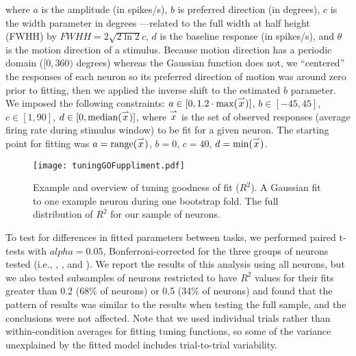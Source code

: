 \noindent where $a$ is the amplitude (in spikes/s), $b$ is preferred direction (in degrees), $c$ is the width parameter in degrees ---related to the full width at half height (FWHH) by $FWHH = 2 \sqrt{2 \ln 2}c$, $d$ is the baseline response (in spikes/s), and $\theta$ is the motion direction of a stimulus.  
Because motion direction has a periodic domain ($[0, 360)$ degrees) whereas the Gaussian function does not, we ``centered'' the responses of each neuron so its preferred direction of motion was around zero prior to fitting, then we applied the inverse shift to the estimated $b$ parameter.
We imposed the following constraints: $a \in [0, 1.2 \cdot \max (\overset{\rightharpoonup} x)]$, $b \in [-45, 45]$, $c \in [1, 90]$, $d \in [0, \textrm{median}(\overset{\rightharpoonup} x)]$, where $\overset{\rightharpoonup} x$ is the set of observed responses (average firing rate during stimulus window) to be fit for a given neuron.
The starting point for fitting was $a = \textrm{range}(\overset{\rightharpoonup} x)$, $b = 0$, $c = 40$, $d = \textrm{min}(\overset{\rightharpoonup} x)$.



	\setcounter{scratchcounter}{\value{figure}}
	\setcounter{figure}{\thesupplementcounter}
	\renewcommand{\figurename}{Supplemental Figure}
	\begin{figure}
		\centering
		\texttt{[image: tuningGOFuppliment.pdf]}
		\caption{Example and overview of tuning goodness of fit ($R^2$). A Gaussian fit to one example neuron during one bootstrap fold. The full distribution of $R^2$ for our sample of neurons.}
		\label{fig:suppFit} %
	\end{figure}
	\setcounter{supplementcounter}{\value{figure}}
	\setcounter{figure}{\thescratchcounter}
	\renewcommand{\figurename}{Figure}
	\addtocounter{page}{-1}
	\thispagestyle{empty}
	\clearpage


To test for differences in fitted parameters between tasks, we performed paired t-tests with $alpha = 0.05$, Bonferroni-corrected for the three groups of neurons tested (i.e., \suppressed, \enhanced, and \consistent). We report the results of this analysis using all neurons, but we also tested subsamples of neurons restricted to have $R^2$ values for their fits greater than 0.2 (68\% of neurons) or 0.5 (34\% of neurons) and found that the pattern of results was similar to the results when testing the full sample, and the conclusions were not affected. Note that we used individual trials rather than within-condition averages for fitting tuning functions, so some of the variance unexplained by the fitted model includes trial-to-trial variability.\label{rev:fitVar}

